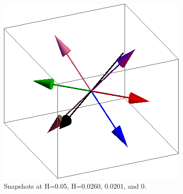 \documentclass{article}
\begin{document}
\begin{figure}[ht]
\includegraphics[scale=0.33]{110/501S005to000R.png}
\caption{Snapshots at H=0.05, H=0.0260, 0.0201, and 0.}
\end{figure}
\clearpage
\end{document}
